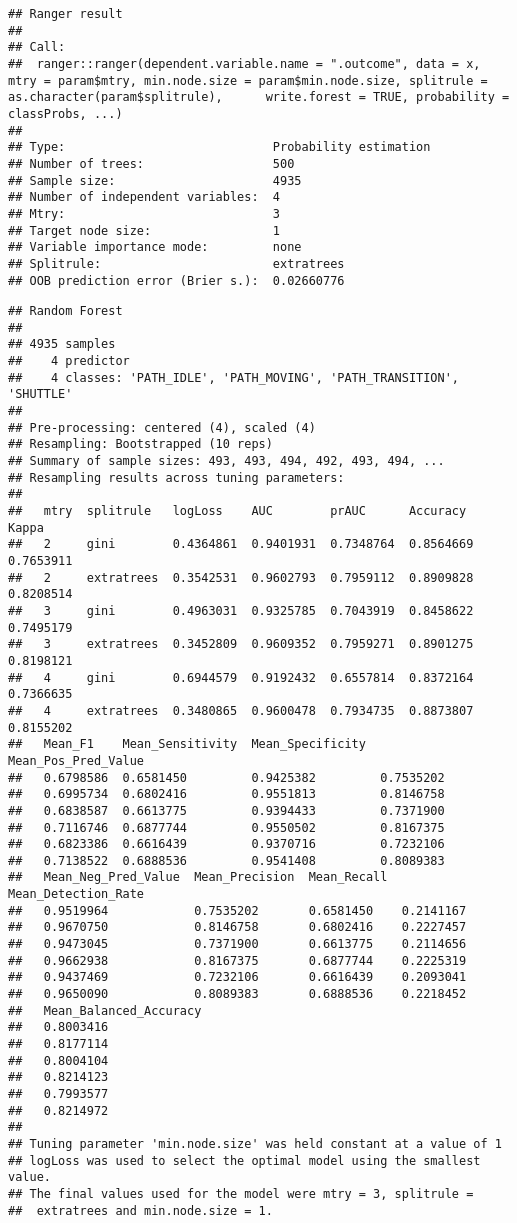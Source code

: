 \documentclass[]{article}
\begin{document}
\begin{verbatim}
## Ranger result
## 
## Call:
##  ranger::ranger(dependent.variable.name = ".outcome", data = x,      mtry = param$mtry, min.node.size = param$min.node.size, splitrule = as.character(param$splitrule),      write.forest = TRUE, probability = classProbs, ...) 
## 
## Type:                             Probability estimation 
## Number of trees:                  500 
## Sample size:                      4935 
## Number of independent variables:  4 
## Mtry:                             3 
## Target node size:                 1 
## Variable importance mode:         none 
## Splitrule:                        extratrees 
## OOB prediction error (Brier s.):  0.02660776
\end{verbatim}

\begin{verbatim}
## Random Forest 
## 
## 4935 samples
##    4 predictor
##    4 classes: 'PATH_IDLE', 'PATH_MOVING', 'PATH_TRANSITION', 'SHUTTLE' 
## 
## Pre-processing: centered (4), scaled (4) 
## Resampling: Bootstrapped (10 reps) 
## Summary of sample sizes: 493, 493, 494, 492, 493, 494, ... 
## Resampling results across tuning parameters:
## 
##   mtry  splitrule   logLoss    AUC        prAUC      Accuracy   Kappa    
##   2     gini        0.4364861  0.9401931  0.7348764  0.8564669  0.7653911
##   2     extratrees  0.3542531  0.9602793  0.7959112  0.8909828  0.8208514
##   3     gini        0.4963031  0.9325785  0.7043919  0.8458622  0.7495179
##   3     extratrees  0.3452809  0.9609352  0.7959271  0.8901275  0.8198121
##   4     gini        0.6944579  0.9192432  0.6557814  0.8372164  0.7366635
##   4     extratrees  0.3480865  0.9600478  0.7934735  0.8873807  0.8155202
##   Mean_F1    Mean_Sensitivity  Mean_Specificity  Mean_Pos_Pred_Value
##   0.6798586  0.6581450         0.9425382         0.7535202          
##   0.6995734  0.6802416         0.9551813         0.8146758          
##   0.6838587  0.6613775         0.9394433         0.7371900          
##   0.7116746  0.6877744         0.9550502         0.8167375          
##   0.6823386  0.6616439         0.9370716         0.7232106          
##   0.7138522  0.6888536         0.9541408         0.8089383          
##   Mean_Neg_Pred_Value  Mean_Precision  Mean_Recall  Mean_Detection_Rate
##   0.9519964            0.7535202       0.6581450    0.2141167          
##   0.9670750            0.8146758       0.6802416    0.2227457          
##   0.9473045            0.7371900       0.6613775    0.2114656          
##   0.9662938            0.8167375       0.6877744    0.2225319          
##   0.9437469            0.7232106       0.6616439    0.2093041          
##   0.9650090            0.8089383       0.6888536    0.2218452          
##   Mean_Balanced_Accuracy
##   0.8003416             
##   0.8177114             
##   0.8004104             
##   0.8214123             
##   0.7993577             
##   0.8214972             
## 
## Tuning parameter 'min.node.size' was held constant at a value of 1
## logLoss was used to select the optimal model using the smallest value.
## The final values used for the model were mtry = 3, splitrule =
##  extratrees and min.node.size = 1.
\end{verbatim}
\end{document}
